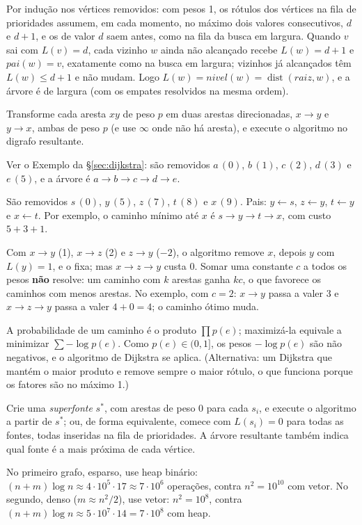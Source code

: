  Por indução nos vértices removidos: com pesos 1, os rótulos dos vértices na fila de prioridades assumem, em cada momento, no máximo dois valores consecutivos, $d$ e $d+1$, e os de valor $d$ saem antes, como na fila da busca em largura. Quando $v$ sai com $L(v)=d$, cada vizinho $w$ ainda não alcançado recebe $L(w)=d+1$ e $pai(w)=v$, exatamente como na busca em largura; vizinhos já alcançados têm $L(w)\le d+1$ e não mudam. Logo $L(w)=nivel(w)=\operatorname{dist}(raiz,w)$, e a árvore é de largura (com os empates resolvidos na mesma ordem).

 Transforme cada aresta $xy$ de peso $p$ em duas arestas direcionadas, $x\to y$ e $y\to x$, ambas de peso $p$ (e use $\infty$ onde não há aresta), e execute o algoritmo no digrafo resultante.

 Ver o Exemplo da §\ref{sec:dijkstra}: são removidos $a\,(0)$, $b\,(1)$, $c\,(2)$, $d\,(3)$ e $e\,(5)$, e a árvore é $a\to b\to c\to d\to e$.

 São removidos $s\,(0)$, $y\,(5)$, $z\,(7)$, $t\,(8)$ e $x\,(9)$. Pais: $y\leftarrow s$, $z\leftarrow y$, $t\leftarrow y$ e $x\leftarrow t$. Por exemplo, o caminho mínimo até $x$ é $s\to y\to t\to x$, com custo $5+3+1$.

 Com $x\to y$ (1), $x\to z$ (2) e $z\to y$ ($-2$), o algoritmo remove $x$, depois $y$ com $L(y)=1$, e o fixa; mas $x\to z\to y$ custa 0. Somar uma constante $c$ a todos os pesos \textbf{não} resolve: um caminho com $k$ arestas ganha $kc$, o que favorece os caminhos com menos arestas. No exemplo, com $c=2$: $x\to y$ passa a valer 3 e $x\to z\to y$ passa a valer $4+0=4$; o caminho ótimo muda.

 A probabilidade de um caminho é o produto $\prod p(e)$; maximizá-la equivale a minimizar $\sum-\log p(e)$. Como $p(e)\in(0,1]$, os pesos $-\log p(e)$ são não negativos, e o algoritmo de Dijkstra se aplica. (Alternativa: um Dijkstra que mantém o maior produto e remove sempre o maior rótulo, o que funciona porque os fatores são no máximo 1.)

 Crie uma \emph{superfonte} $s^*$, com arestas de peso 0 para cada $s_i$, e execute o algoritmo a partir de $s^*$; ou, de forma equivalente, comece com $L(s_i)=0$ para todas as fontes, todas inseridas na fila de prioridades. A árvore resultante também indica qual fonte é a mais próxima de cada vértice.

 No primeiro grafo, esparso, use heap binário: $(n+m)\log n\approx4\cdot10^5\cdot17\approx7\cdot10^6$ operações, contra $n^2=10^{10}$ com vetor. No segundo, denso ($m\approx n^2/2$), use vetor: $n^2=10^8$, contra $(n+m)\log n\approx5\cdot10^7\cdot14=7\cdot10^8$ com heap.

